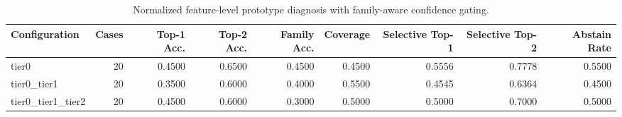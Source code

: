 \begin{table}[t]
\centering
\caption{Normalized feature-level prototype diagnosis with family-aware confidence gating.}
\label{tab:dice_stressor_hierarchical_diagnosis}
\footnotesize
\begin{tabular}{lrrrrrrrr}
\toprule
Configuration & Cases & Top-1 Acc. & Top-2 Acc. & Family Acc. & Coverage & Selective Top-1 & Selective Top-2 & Abstain Rate \\
\midrule
tier0 & 20 & 0.4500 & 0.6500 & 0.4500 & 0.4500 & 0.5556 & 0.7778 & 0.5500 \\
tier0_tier1 & 20 & 0.3500 & 0.6000 & 0.4000 & 0.5500 & 0.4545 & 0.6364 & 0.4500 \\
tier0_tier1_tier2 & 20 & 0.4500 & 0.6000 & 0.3000 & 0.5000 & 0.5000 & 0.7000 & 0.5000 \\
\bottomrule
\end{tabular}

\end{table}
